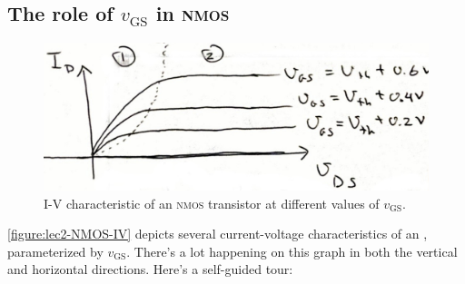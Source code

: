 \subsection{The role of \(v_\text{GS}\) in \textsc{nmos}}
\begin{figure}
  \centering
  \includegraphics[width=\linewidth]{figures/NMOS-IV}
  \caption{I-V characteristic of an \textsc{nmos} transistor at different values of \(v_\text{GS}\).}
  \label{figure:lec2-NMOS-IV}
\end{figure}
\autoref{figure:lec2-NMOS-IV} depicts several current-voltage characteristics of an , parameterized by \(v_\text{GS}\).
There's a lot happening on this graph in both the vertical and horizontal directions.
Here's a self-guided tour:

